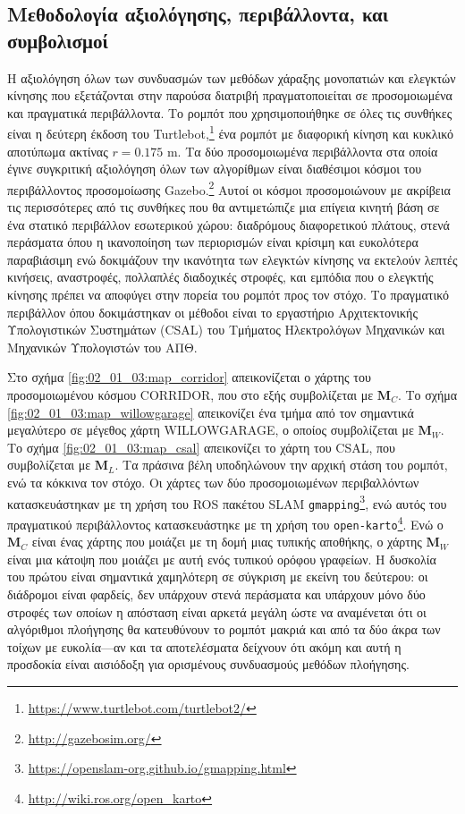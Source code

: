 \subsection{Μεθοδολογία αξιολόγησης, περιβάλλοντα, και συμβολισμοί}
\label{subsection:02_01_03:01}

Η αξιολόγηση όλων των συνδυασμών των μεθόδων χάραξης μονοπατιών και ελεγκτών
κίνησης που εξετάζονται στην παρούσα διατριβή πραγματοποιείται σε προσομοιωμένα
και πραγματικά περιβάλλοντα. Το ρομπότ που χρησιμοποιήθηκε σε όλες τις συνθήκες
είναι η δεύτερη έκδοση του
Turtlebot,\footnote{\url{https://www.turtlebot.com/turtlebot2/}} ένα ρομπότ με
διαφορική κίνηση και κυκλικό αποτύπωμα ακτίνας $r=0.175$ m. Τα δύο
προσομοιωμένα περιβάλλοντα στα οποία έγινε συγκριτική αξιολόγηση όλων των
αλγορίθμων είναι διαθέσιμοι κόσμοι του περιβάλλοντος προσομοίωσης
Gazebo.\footnote{\url{http://gazebosim.org/}} Αυτοί οι κόσμοι προσομοιώνουν με
ακρίβεια τις περισσότερες από τις συνθήκες που θα αντιμετώπιζε μια επίγεια
κινητή βάση σε ένα στατικό περιβάλλον εσωτερικού χώρου: διαδρόμους διαφορετικού
πλάτους, στενά περάσματα όπου η ικανοποίηση των περιορισμών είναι κρίσιμη και
ευκολότερα παραβιάσιμη ενώ δοκιμάζουν την ικανότητα των ελεγκτών κίνησης να
εκτελούν λεπτές κινήσεις, αναστροφές, πολλαπλές διαδοχικές στροφές, και εμπόδια
που ο ελεγκτής κίνησης πρέπει να αποφύγει στην πορεία του ρομπότ προς
τον στόχο. Το πραγματικό περιβάλλον όπου δοκιμάστηκαν οι μέθοδοι είναι το
εργαστήριο Αρχιτεκτονικής Υπολογιστικών Συστημάτων (CSAL) του Τμήματος
Ηλεκτρολόγων Μηχανικών και Μηχανικών Υπολογιστών του ΑΠΘ.

Στο σχήμα \ref{fig:02_01_03:map_corridor} απεικονίζεται ο χάρτης του
προσομοιωμένου κόσμου CORRIDOR, που στο εξής συμβολίζεται με $\bm{M}_C$. Το
σχήμα \ref{fig:02_01_03:map_willowgarage} απεικονίζει ένα τμήμα από τον
σημαντικά μεγαλύτερο σε μέγεθος χάρτη WILLOWGARAGE, ο οποίος συμβολίζεται με
$\bm{M}_W$. Το σχήμα \ref{fig:02_01_03:map_csal} απεικονίζει το χάρτη του CSAL,
που συμβολίζεται με $\bm{M}_L$.  Τα πράσινα βέλη υποδηλώνουν την αρχική στάση
του ρομπότ, ενώ τα κόκκινα τον στόχο. Οι χάρτες των δύο προσομοιωμένων
περιβαλλόντων κατασκευάστηκαν με τη χρήση του ROS πακέτου SLAM
\texttt{gmapping}\footnote{\url{https://openslam-org.github.io/gmapping.html}},
ενώ αυτός του πραγματικού περιβάλλοντος κατασκευάστηκε με τη χρήση του
\texttt{open-karto}\footnote{\url{http://wiki.ros.org/open\_karto}}. Ενώ ο
$\bm{M}_C$ είναι ένας χάρτης που μοιάζει με τη δομή μιας τυπικής αποθήκης, ο
χάρτης $\bm{M}_W$ είναι μια κάτοψη που μοιάζει με αυτή ενός τυπικού ορόφου
γραφείων. Η δυσκολία του πρώτου είναι σημαντικά χαμηλότερη σε σύγκριση με
εκείνη του δεύτερου: οι διάδρομοι είναι φαρδείς, δεν υπάρχουν στενά περάσματα
και υπάρχουν μόνο δύο στροφές των οποίων η απόσταση είναι αρκετά μεγάλη ώστε να
αναμένεται ότι οι αλγόριθμοι πλοήγησης θα κατευθύνουν το ρομπότ μακριά και από
τα δύο άκρα των τοίχων με ευκολία---αν και τα αποτελέσματα δείχνουν ότι ακόμη
και αυτή η προσδοκία είναι αισιόδοξη για ορισμένους συνδυασμούς μεθόδων
πλοήγησης.

